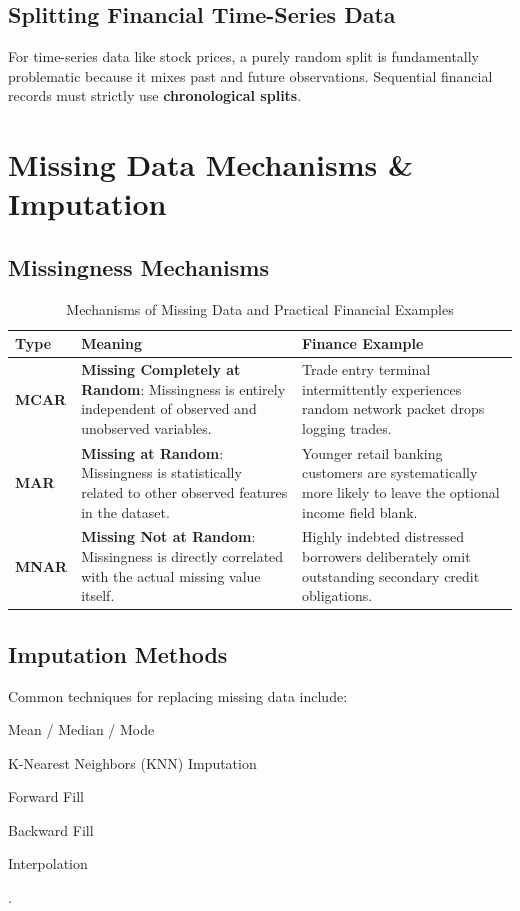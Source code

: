 \subsection{Splitting Financial Time-Series Data}
For time-series data like stock prices, a purely random split is fundamentally problematic because it mixes past and future observations. Sequential financial records must strictly use \textbf{chronological splits}.

\section{Missing Data Mechanisms \& Imputation}

\subsection{Missingness Mechanisms}

\begin{table}[htbp]
\centering
\caption{Mechanisms of Missing Data and Practical Financial Examples}
\vspace{0.2em}
\begin{tabularx}{\textwidth}{p{2.0cm}p{6.0cm}X}
\toprule
\textbf{Type} & \textbf{Meaning} & \textbf{Finance Example} \\
\midrule
\textbf{MCAR} & \textbf{Missing Completely at Random}: Missingness is entirely independent of observed and unobserved variables. & Trade entry terminal intermittently experiences random network packet drops logging trades. \\
\addlinespace[0.5em]
\textbf{MAR} & \textbf{Missing at Random}: Missingness is statistically related to other observed features in the dataset. & Younger retail banking customers are systematically more likely to leave the optional income field blank. \\
\addlinespace[0.5em]
\textbf{MNAR} & \textbf{Missing Not at Random}: Missingness is directly correlated with the actual missing value itself. & Highly indebted distressed borrowers deliberately omit outstanding secondary credit obligations. \\
\bottomrule
\end{tabularx}
\end{table}

\subsection{Imputation Methods}

Common techniques for replacing missing data include:
\begin{itemize*}[itemjoin={, }, itemjoin*={, and }]
    \item Mean / Median / Mode
    \item K-Nearest Neighbors (KNN) Imputation
    \item Forward Fill
    \item Backward Fill
    \item Interpolation
\end{itemize*}.

